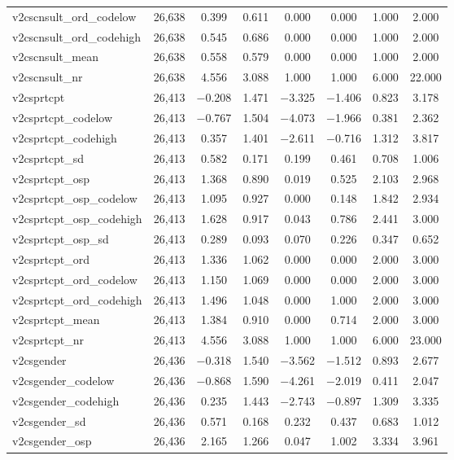 \begin{table}[!htbp]
\begin{tabular}{@{\extracolsep{5pt}}lccccccc}
v2cscnsult\_ord\_codelow & 26,638 & 0.399 & 0.611 & 0.000 & 0.000 & 1.000 & 2.000 \\ 
v2cscnsult\_ord\_codehigh & 26,638 & 0.545 & 0.686 & 0.000 & 0.000 & 1.000 & 2.000 \\ 
v2cscnsult\_mean & 26,638 & 0.558 & 0.579 & 0.000 & 0.000 & 1.000 & 2.000 \\ 
v2cscnsult\_nr & 26,638 & 4.556 & 3.088 & 1.000 & 1.000 & 6.000 & 22.000 \\ 
v2csprtcpt & 26,413 & $-$0.208 & 1.471 & $-$3.325 & $-$1.406 & 0.823 & 3.178 \\ 
v2csprtcpt\_codelow & 26,413 & $-$0.767 & 1.504 & $-$4.073 & $-$1.966 & 0.381 & 2.362 \\ 
v2csprtcpt\_codehigh & 26,413 & 0.357 & 1.401 & $-$2.611 & $-$0.716 & 1.312 & 3.817 \\ 
v2csprtcpt\_sd & 26,413 & 0.582 & 0.171 & 0.199 & 0.461 & 0.708 & 1.006 \\ 
v2csprtcpt\_osp & 26,413 & 1.368 & 0.890 & 0.019 & 0.525 & 2.103 & 2.968 \\ 
v2csprtcpt\_osp\_codelow & 26,413 & 1.095 & 0.927 & 0.000 & 0.148 & 1.842 & 2.934 \\ 
v2csprtcpt\_osp\_codehigh & 26,413 & 1.628 & 0.917 & 0.043 & 0.786 & 2.441 & 3.000 \\ 
v2csprtcpt\_osp\_sd & 26,413 & 0.289 & 0.093 & 0.070 & 0.226 & 0.347 & 0.652 \\ 
v2csprtcpt\_ord & 26,413 & 1.336 & 1.062 & 0.000 & 0.000 & 2.000 & 3.000 \\ 
v2csprtcpt\_ord\_codelow & 26,413 & 1.150 & 1.069 & 0.000 & 0.000 & 2.000 & 3.000 \\ 
v2csprtcpt\_ord\_codehigh & 26,413 & 1.496 & 1.048 & 0.000 & 1.000 & 2.000 & 3.000 \\ 
v2csprtcpt\_mean & 26,413 & 1.384 & 0.910 & 0.000 & 0.714 & 2.000 & 3.000 \\ 
v2csprtcpt\_nr & 26,413 & 4.556 & 3.088 & 1.000 & 1.000 & 6.000 & 23.000 \\ 
v2csgender & 26,436 & $-$0.318 & 1.540 & $-$3.562 & $-$1.512 & 0.893 & 2.677 \\ 
v2csgender\_codelow & 26,436 & $-$0.868 & 1.590 & $-$4.261 & $-$2.019 & 0.411 & 2.047 \\ 
v2csgender\_codehigh & 26,436 & 0.235 & 1.443 & $-$2.743 & $-$0.897 & 1.309 & 3.335 \\ 
v2csgender\_sd & 26,436 & 0.571 & 0.168 & 0.232 & 0.437 & 0.683 & 1.012 \\ 
v2csgender\_osp & 26,436 & 2.165 & 1.266 & 0.047 & 1.002 & 3.334 & 3.961 \\ 

\end{tabular}
\end{table}
